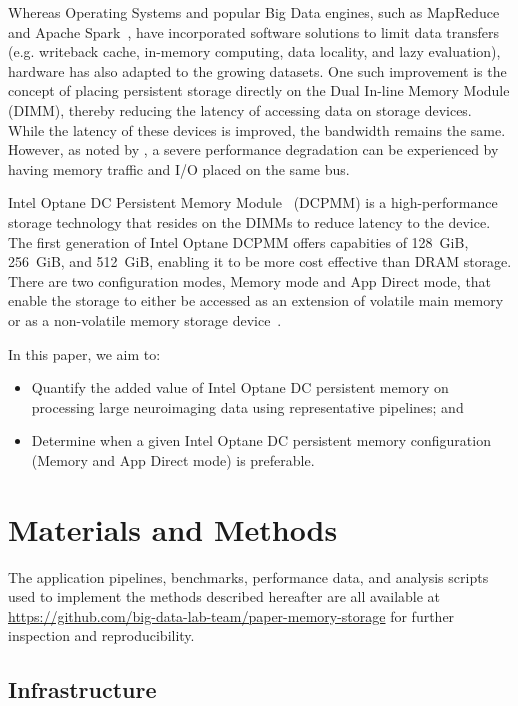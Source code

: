 \documentclass[conference]{IEEEtran}
\begin{document}
Whereas Operating Systems and popular Big Data engines, such as MapReduce~\cite{mapreduce} and Apache Spark~\cite{spark}, have
incorporated software solutions to limit data transfers (e.g. writeback cache, in-memory computing,
data locality, and lazy evaluation), hardware has also adapted to the growing datasets.
One such improvement is the concept of placing persistent storage directly on the Dual
In-line Memory Module (DIMM), thereby reducing the latency of accessing data on 
storage devices. While the latency of these devices is improved, the bandwidth
remains the same. However, as noted by \cite{nvdimms}, a severe performance degradation
can be experienced by having memory traffic and I/O placed on the same bus.


Intel Optane DC Persistent Memory Module~\cite{optanebrief} (DCPMM) is a high-performance
storage technology that resides on the DIMMs to reduce latency to the device.
The first generation of Intel Optane DCPMM offers capabities of 128~GiB,
256~GiB, and 512~GiB, enabling it to be more cost effective than DRAM storage.
There are two configuration modes, Memory mode and App Direct mode,
that enable the storage to either be accessed as an extension of volatile main memory
or as a non-volatile memory storage device~\cite{memory-modes}.


In this paper, we aim to:
\begin{itemize}
        \item Quantify the added value of Intel Optane DC persistent memory on 
            processing large neuroimaging data using representative pipelines; and
        \item Determine when a given Intel Optane DC persistent memory configuration (Memory 
            and App Direct mode) is preferable.
\end{itemize}

\section{Materials and Methods}
The application pipelines, benchmarks, performance data, and analysis scripts used 
to implement the methods described hereafter are all available at 
\url{https://github.com/big-data-lab-team/paper-memory-storage} for 
further inspection and reproducibility.

\subsection{Infrastructure}
\end{document}
